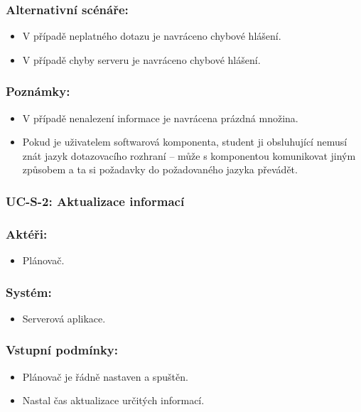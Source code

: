 \subsubsection*{Alternativní scénáře:}
\begin{itemize}
 \item V případě neplatného dotazu je navráceno chybové hlášení.
 \item V případě chyby serveru je navráceno chybové hlášení.
\end{itemize}
\subsubsection*{Poznámky:}
\begin{itemize}
 \item V případě nenalezení informace je navrácena prázdná množina.
 \item Pokud je uživatelem softwarová komponenta, student ji obsluhující nemusí znát jazyk dotazovacího rozhraní -- může s komponentou komunikovat jiným způsobem a ta si požadavky do požadovaného jazyka převádět.
\end{itemize}

\subsubsection{UC-S-2: Aktualizace informací}
\subsubsection*{Aktéři:}
\begin{itemize}
 \item Plánovač.
\end{itemize}
\subsubsection*{Systém:}
\begin{itemize}
 \item Serverová aplikace.
\end{itemize}
\subsubsection*{Vstupní podmínky:}
\begin{itemize}
 \item Plánovač je řádně nastaven a spuštěn.
 \item Nastal čas aktualizace určitých informací.
\end{itemize}
